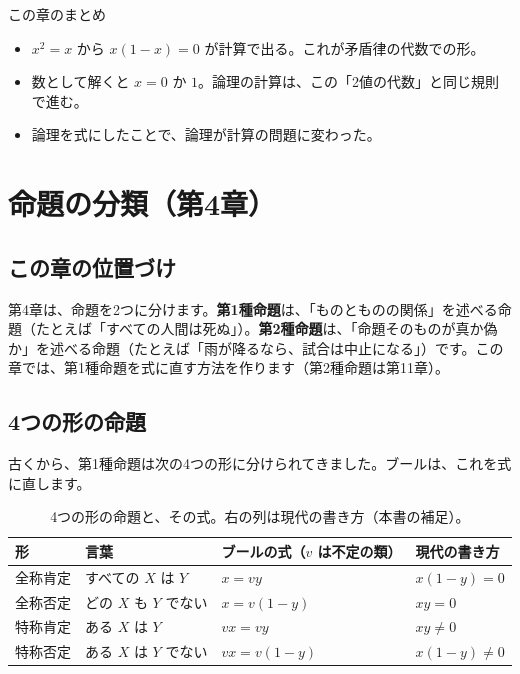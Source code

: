 \documentclass[a4paper,11pt,openany]{ltjsbook}
\begin{document}
\begin{pointbox}{この章のまとめ}
\begin{itemize}[leftmargin=*]
\item $x^2=x$ から $x(1-x)=0$ が計算で出る。これが矛盾律の代数での形。
\item 数として解くと $x=0$ か $1$。論理の計算は、この「2値の代数」と同じ規則で進む。
\item 論理を式にしたことで、論理が計算の問題に変わった。
\end{itemize}
\end{pointbox}

\chapter{命題の分類（第4章）}

\section{この章の位置づけ}

第4章は、命題を2つに分けます。\textbf{第1種命題}は、「ものとものの関係」を述べる命題（たとえば「すべての人間は死ぬ」）。\textbf{第2種命題}は、「命題そのものが真か偽か」を述べる命題（たとえば「雨が降るなら、試合は中止になる」）です。この章では、第1種命題を式に直す方法を作ります（第2種命題は第11章）。

\section{4つの形の命題}

古くから、第1種命題は次の4つの形に分けられてきました。ブールは、これを式に直します。

\begin{table}[htbp]
\centering
\begin{tabular}{llll}
\toprule
形 & 言葉 & ブールの式（$v$ は不定の類） & 現代の書き方\\
\midrule
全称肯定 & すべての $X$ は $Y$ & $x=vy$ & $x(1-y)=0$\\
全称否定 & どの $X$ も $Y$ でない & $x=v(1-y)$ & $xy=0$\\
特称肯定 & ある $X$ は $Y$ & $vx=vy$ & $xy\neq0$\\
特称否定 & ある $X$ は $Y$ でない & $vx=v(1-y)$ & $x(1-y)\neq0$\\
\bottomrule
\end{tabular}
\caption{4つの形の命題と、その式。右の列は現代の書き方（本書の補足）。}
\end{table}
\end{document}
